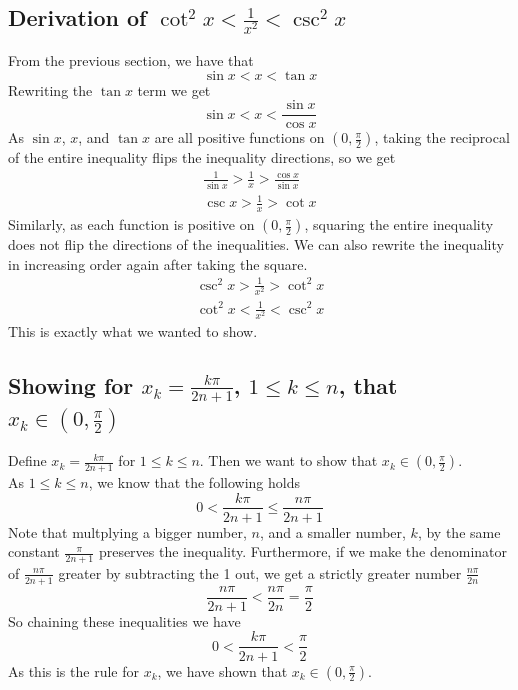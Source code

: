 \documentclass[11pt,reqno, tikz, border=3mm]{amsart}
\theoremstyle{plain}
\theoremstyle{definition}
\theoremstyle{remark}
\begin{document}
\subsection{Derivation of $\cot^2x < \frac{1}{x^2} < \csc^2x$}
From the previous section, we have that 
$$\sin x < x < \tan x$$
Rewriting the $\tan x$ term we get
$$\sin x < x < \frac{\sin x}{\cos x}$$
As $\sin x$, $x$, and $\tan x$ are all positive functions on $(0, \frac{\pi}{2})$, taking the reciprocal of the entire inequality flips the inequality directions, so we get
\begin{align}
\frac{1}{\sin x} > \frac{1}{x} > \frac{\cos x}{\sin x} \\
\csc x > \frac{1}{x} > \cot x
\end{align}
Similarly, as each function is positive on $(0, \frac{\pi}{2})$, squaring the entire inequality does not flip the directions of the inequalities. We can also rewrite the inequality in increasing order again after taking the square.
\begin{align} 
\csc^2x > \frac{1}{x^2} > \cot^2x \\
\cot^2x < \frac{1}{x^2} < \csc^2x
\end{align}
This is exactly what we wanted to show.

\subsection{Showing for $x_k = \frac{k\pi}{2n+1}$, $1 \le k \le n$,  that $x_k \in (0, \frac{\pi}{2})$} 
Define $x_k =  \frac{k\pi}{2n+1}$ for $1 \le k \le n$. Then we want to show that $x_k \in (0, \frac{\pi}{2})$. \\

As $1\le k \le n$, we know that the following holds 
$$ 0 < \frac{k\pi}{2n+1} \le \frac{n\pi}{2n + 1}$$
Note that multplying a bigger number, $n$, and a smaller number, $k$, by the same constant $\frac{\pi}{2n+1}$ preserves the inequality. Furthermore, if we make the denominator of $\frac{n\pi}{2n+1}$ greater by subtracting the 1 out, we get a strictly greater number $\frac{n\pi}{2n}$
$$\frac{n\pi}{2n+1} < \frac{n\pi}{2n} = \frac{\pi}{2}$$
So chaining these inequalities we have
$$0 < \frac{k\pi}{2n+1} < \frac{\pi}{2}$$
As this is the rule for $x_k$, we have shown that $x_k \in (0,\frac{\pi}{2})$.
\end{document}

